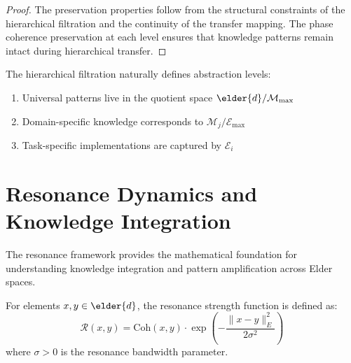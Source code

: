 \begin{proof}
The preservation properties follow from the structural constraints of the hierarchical filtration and the continuity of the transfer mapping. The phase coherence preservation at each level ensures that knowledge patterns remain intact during hierarchical transfer.
\end{proof}

\begin{corollary}
The hierarchical filtration naturally defines abstraction levels:
\begin{enumerate}
    \item Universal patterns live in the quotient space $\elder{d}/\mathcal{M}_{\max}$
    \item Domain-specific knowledge corresponds to $\mathcal{M}_j/\mathcal{E}_{\max}$
    \item Task-specific implementations are captured by $\mathcal{E}_i$
\end{enumerate}
\end{corollary}

\section{Resonance Dynamics and Knowledge Integration}

The resonance framework provides the mathematical foundation for understanding knowledge integration and pattern amplification across Elder spaces.

\begin{definition}
For elements $x, y \in \elder{d}$, the resonance strength function is defined as:
\begin{equation}
\mathcal{R}(x, y) = \text{Coh}(x, y) \cdot \exp\left(-\frac{\|x - y\|_E^2}{2\sigma^2}\right)
\end{equation}
where $\sigma > 0$ is the resonance bandwidth parameter.
\end{definition}

